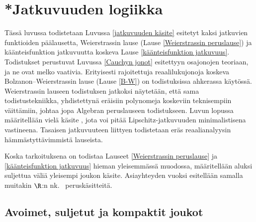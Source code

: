 \section{*Jatkuvuuden logiikka} \label{jatkuvuuden logiikka}
\alku

Tässä luvussa todistetaan Luvussa \ref{jatkuvuuden käsite} esitetyt kaksi jatkuvien
funktioiden päälausetta, Weierstrassin lause (Lause \ref{Weierstrassin peruslause}) ja
käänteisfunktion jatkuvuutta koskeva Lause \ref{käänteisfunktion jatkuvuus}. Todistukset
perustuvat Luvussa \ref{Cauchyn jonot} esitettyyn osajonojen teoriaan, ja ne ovat melko
vaativia. Erityisesti rajoitettuja reaalilukujonoja koskeva Bolzanon--Weierstrassin lause
(Lause \ref{B-W}) on todistuksissa ahkerassa käytössä. Weierstrassin lauseen todistuksen
jatkoksi näytetään, että sama todistustekniikka, yhdistettynä eräisiin polynomeja koskeviin
teknisempiin väittämiin, johtaa jopa Algebran peruslauseen todistukseen. Luvun lopussa
määritellään vielä käsite , jota voi pitää Lipschitz-jatkuvuuden
minimalistisena vastineena. Tasaisen jatkuvuuteen liittyen todistetaan eräs reaalianalyysin
hämmästyttävimmistä lauseista.

Koska tarkoituksena on todistaa Lauseet \ref{Weierstrassin peruslause} ja 
\ref{käänteisfunktion jatkuvuus} hieman yleisemmässä muodossa, määritellään aluksi
suljettua väliä yleisempi  joukon käsite. Asiayhteyden vuoksi esitellään
samalla muitakin $\R$:n nk.\  peruskäsitteitä.
 
\subsection{Avoimet, suljetut ja kompaktit joukot}


